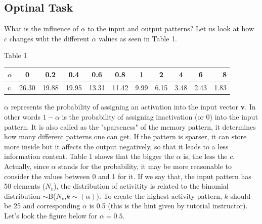 \documentclass{article}
\begin{document}
\subsection{Optinal Task}

What is the influence of $\alpha$ to the input and output patterns? Let us look at how $c$ changes wiht the different $\alpha$ values as seen in Table 1.\newline

\begin{center}
\begin{footnotesize}Table 1 
 \end{footnotesize} 
\end{center}

\begin{center}
 \begin{tabular} {l || c|c|c| c|c|c| c|c|c| r }
$\alpha$ & 0 & 0.2 & 0.4 & 0.6 & 0.8 & 1 & 2 & 4 & 6 &8 \\ \hline
 c & 26.30 & 19.88 & 19.95 & 13.31 & 11.42 & 9.99 & 6.15 & 3.48&2.43&1.83\\
  
 \end{tabular}

\end{center}

$\alpha$ represents the probability of assigning an activation into the input vector \textbf{v}. In other words $1-\alpha$ is the probability of assigning inactivation (or 0) into the input pattern. It is also called as the "sparseness" of the memory pattern, it determines how mony different patterns one can get. If the pattern is sparser, it can store more inside but it affects the output negatively, so that it leads to a less information content. Table 1 shows that the bigger the $\alpha$ is, the less the $c$. Actually, since $\alpha$ stands for the probability, it may be more reasonable to consider the values between 0 and 1 for it. If we say that, the input pattern has 50 elements ($N_v$), the distribution of activitity is related to the binomial distribution $\sim$B($N_v$,$k\sim(\alpha)$). To create the highest activity pattern, $k$ should be 25 and corresponding $\alpha$ is 0.5 (this is the hint given by tutorial instructor). Let's look the figure below for $\alpha=0.5$.
\end{document}
